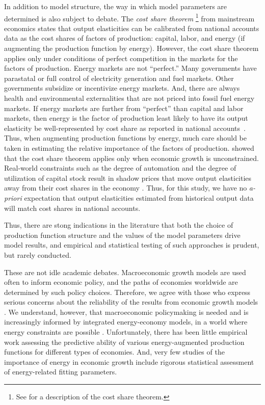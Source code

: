 \documentclass[preprint,authoryear,12pt]{elsarticle}\usepackage[]{graphicx}\usepackage[]{color}
\begin{document}
In addition to model structure, 
the way in which model parameters are determined is also subject to debate.
The \emph{cost share theorem}%
  \footnote{
  See \citet[p.~150]{Kummel:2010vz} for a description of the cost share theorem.
  }
from mainstream economics states that 
output elasticities 
can be calibrated from national accounts data as the 
cost shares of factors of production: capital, labor, 
and energy (if augmenting the production function by energy).
However, the cost share theorem applies only under conditions of perfect competition
in the markets for the factors of production.
Energy markets are not ``perfect.''
Many governments have parastatal or full control 
of electricity generation and fuel markets.  
Other governments subsidize or incentivize energy markets.  
And, there are always health and environmental externalities 
that are not priced into fossil fuel energy markets.  
If energy markets are further from ``perfect'' 
than capital and labor markets, 
then energy is the factor of production least likely to have its
output elasticity be well-represented 
by cost share as reported in national accounts~\citep{Ayres:2013aa, Kummel:2013aa}.
Thus, when augmenting production functions by energy, 
much care should be taken in estimating 
the relative importance of the factors of production. 
\citet{Kummel:2010vz} showed that the cost share theorem applies 
only when economic growth is unconstrained.
Real-world constraints such as the degree of automation and
the degree of utilization of capital stock 
result in shadow prices that move 
output elasticities away from 
their cost shares in the economy \citep[Equations~12 and~13]{Kummel:2010vz}.
Thus, for this study, 
we have no \emph{a-priori} expectation that output elasticities 
estimated from historical output data
will match cost shares in national accounts.

Thus, there are stong indications in the literature that
both the choice of production function structure 
and the values of the model parameters 
drive model results, and empirical and statistical testing 
of such approaches is prudent, but rarely conducted.

These are not idle academic debates. 
Macroeconomic growth models are used often to inform economic policy,
and the paths of economies worldwide are determined by
such policy choices. 
Therefore, we agree with those who express serious concerns 
about the reliability of the results from economic growth models \citep{Lecca:2011kr}.
We understand, however, 
that macroeconomic policymaking is needed 
and is increasingly informed by integrated energy-economy models, 
in a world where energy constraints are possible \citep{Beckman:2011gb, 
Benes:2012tm, Nel:2010fv, Kummel:2010vz}.
Unfortunately, there has been little empirical work assessing the predictive ability 
of various energy-augmented production functions for different types of economies. 
And, very few studies of the importance of energy in economic growth include 
rigorous statistical assessment of energy-related fitting parameters. 
\end{document}
